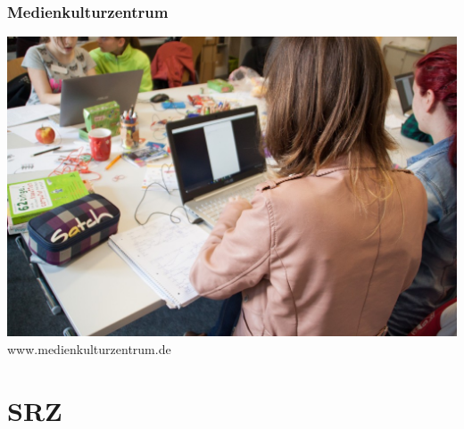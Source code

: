 \documentclass[12pt]{beamer}
\newcommand{\license}[2][]{\\#2\ifthenelse{\equal{#1}{}}{}{\\\scriptsize\url{#1}}}
\begin{document}
  \begin{frame}
	\frametitle{Medienkulturzentrum}
	\begin{minipage}{\linewidth}
		\centering
		\includegraphics[height=0.7\textheight]{img//medienkulturzentrum-apps-games-coding.jpg}
		\tiny\license{www.medienkulturzentrum.de}
	\end{minipage}
  \end{frame}


  \section{SRZ}
  \subsection{}
	  
\end{document}
